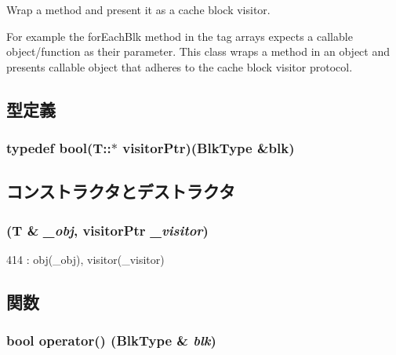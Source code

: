 Wrap a method and present it as a cache block visitor.

For example the forEachBlk method in the tag arrays expects a callable object/function as their parameter. This class wraps a method in an object and presents callable object that adheres to the cache block visitor protocol. 

\subsection{型定義}
\hypertarget{classCacheBlkVisitorWrapper_a0bf73e583655a4e26c9b2ef77e4acfdd}{
\subsubsection[{visitorPtr}]{\setlength{\rightskip}{0pt plus 5cm}typedef bool(T::$\ast$ {\bf visitorPtr})(BlkType \&blk)}}
\label{classCacheBlkVisitorWrapper_a0bf73e583655a4e26c9b2ef77e4acfdd}


\subsection{コンストラクタとデストラクタ}
\hypertarget{classCacheBlkVisitorWrapper_a87ec4b04329314cd52a2c265f45c762b}{
\subsubsection[{CacheBlkVisitorWrapper}]{ (T \& {\em \_\-obj}, \/  {\bf visitorPtr} {\em \_\-visitor})}}
\label{classCacheBlkVisitorWrapper_a87ec4b04329314cd52a2c265f45c762b}



\begin{DoxyCode}
414         : obj(_obj), visitor(_visitor) {}
\end{DoxyCode}


\subsection{関数}
\hypertarget{classCacheBlkVisitorWrapper_af8429f9c21cde9e60c7fe57e0f14a0ef}{
\subsubsection[{operator()}]{\setlength{\rightskip}{0pt plus 5cm}bool operator() (BlkType \& {\em blk})}}
\label{classCacheBlkVisitorWrapper_af8429f9c21cde9e60c7fe57e0f14a0ef}



